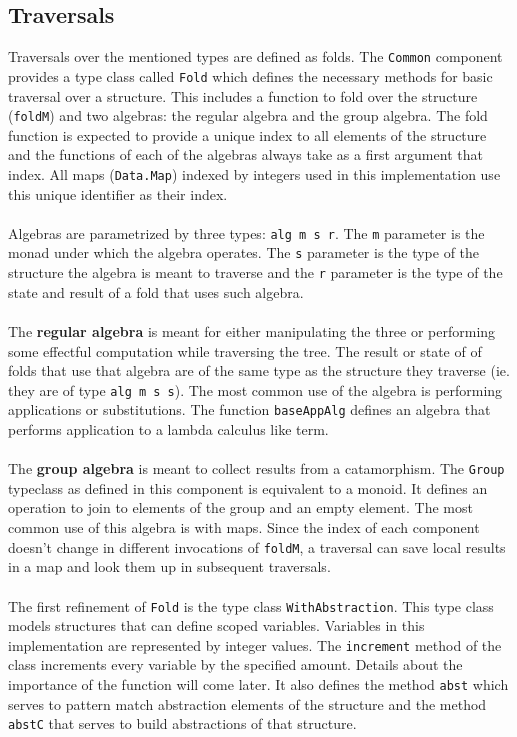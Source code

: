 \documentclass[8pt]{extarticle}
\begin{document}
\subsection{Traversals}
Traversals over the mentioned types are defined as folds. The \verb+Common+ component provides a type class called \verb+Fold+ which defines the necessary methods for basic traversal over a structure. This includes a function to fold over the structure (\verb+foldM+) and two algebras: the regular algebra and the group algebra. The fold function is expected to provide a unique index to all elements of the structure and the functions of each of the algebras always take as a first argument that index. All maps (\verb+Data.Map+) indexed by integers used in this implementation use this unique identifier as their index.
\\\\
Algebras are parametrized by three types: \verb+alg m s r+. The \verb+m+ parameter is the monad under which the algebra operates. The \verb+s+ parameter is the type of the structure the algebra is meant to traverse and the \verb+r+ parameter is the type of the state and result of a fold that uses such algebra.
\\\\
The {\bf regular algebra} is meant for either manipulating the three or performing some effectful computation while traversing the tree. The result or state of of folds that use that algebra are of the same type as the structure they traverse (ie. they are of type \verb+alg m s s+). The most common use of the algebra is performing applications or substitutions. The function \verb+baseAppAlg+ defines an algebra that performs application to a lambda calculus like term.
\\\\
The {\bf group algebra} is meant to collect results from a catamorphism. The \verb+Group+ typeclass as defined in this component is equivalent to a monoid. It defines an operation to join to elements of the group and an empty element. The most common use of this algebra is with maps. Since the index of each component doesn't change in different invocations of \verb+foldM+, a traversal can save local results in a map and look them up in subsequent traversals.
\\\\
The first refinement of \verb+Fold+ is the type class \verb+WithAbstraction+. This type class models structures that can define scoped variables. Variables in this implementation are represented by integer values. The \verb+increment+ method of the class increments every variable by the specified amount. Details about the importance of the function will come later. It also defines the method \verb+abst+ which serves to pattern match abstraction elements of the structure and the method \verb+abstC+ that serves to build abstractions of that structure.
\end{document}
